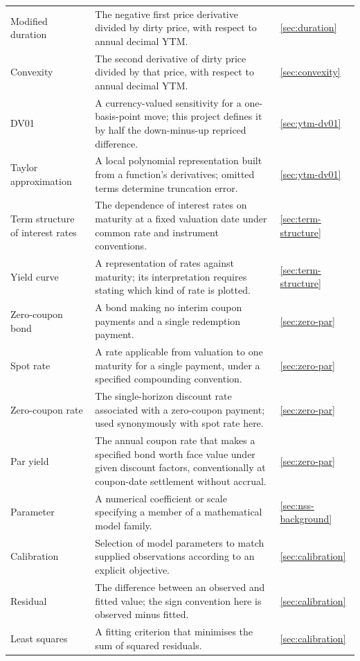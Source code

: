 \begin{longtable}{@{}L{0.22\textwidth}L{0.58\textwidth}L{0.12\textwidth}@{}}
Modified duration & The negative first price derivative divided by dirty price, with respect to annual decimal YTM. & \ref{sec:duration}\\
Convexity & The second derivative of dirty price divided by that price, with respect to annual decimal YTM. & \ref{sec:convexity}\\
DV01 & A currency-valued sensitivity for a one-basis-point move; this project defines it by half the down-minus-up repriced difference. & \ref{sec:ytm-dv01}\\
Taylor approximation & A local polynomial representation built from a function's derivatives; omitted terms determine truncation error. & \ref{sec:ytm-dv01}\\
Term structure of interest rates & The dependence of interest rates on maturity at a fixed valuation date under common rate and instrument conventions. & \ref{sec:term-structure}\\
Yield curve & A representation of rates against maturity; its interpretation requires stating which kind of rate is plotted. & \ref{sec:term-structure}\\
Zero-coupon bond & A bond making no interim coupon payments and a single redemption payment. & \ref{sec:zero-par}\\
Spot rate & A rate applicable from valuation to one maturity for a single payment, under a specified compounding convention. & \ref{sec:zero-par}\\
Zero-coupon rate & The single-horizon discount rate associated with a zero-coupon payment; used synonymously with spot rate here. & \ref{sec:zero-par}\\
Par yield & The annual coupon rate that makes a specified bond worth face value under given discount factors, conventionally at coupon-date settlement without accrual. & \ref{sec:zero-par}\\
Parameter & A numerical coefficient or scale specifying a member of a mathematical model family. & \ref{sec:nss-background}\\
Calibration & Selection of model parameters to match supplied observations according to an explicit objective. & \ref{sec:calibration}\\
Residual & The difference between an observed and fitted value; the sign convention here is observed minus fitted. & \ref{sec:calibration}\\
Least squares & A fitting criterion that minimises the sum of squared residuals. & \ref{sec:calibration}\\

\end{longtable}

